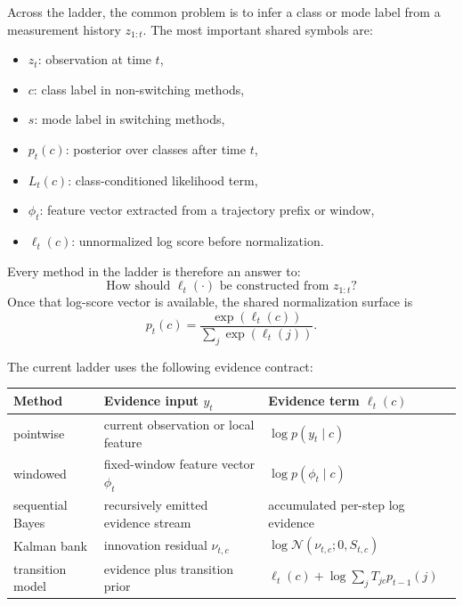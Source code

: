 \documentclass[11pt]{article}
\begin{document}
Across the ladder, the common problem is to infer a class or mode label from a
measurement history \(z_{1:t}\). The most important shared symbols are:
\begin{itemize}[leftmargin=1.5em]
    \item \(z_t\): observation at time \(t\),
    \item \(c\): class label in non-switching methods,
    \item \(s\): mode label in switching methods,
    \item \(p_t(c)\): posterior over classes after time \(t\),
    \item \(L_t(c)\): class-conditioned likelihood term,
    \item \(\phi_t\): feature vector extracted from a trajectory prefix or window,
    \item \(\ell_t(c)\): unnormalized log score before normalization.
\end{itemize}

Every method in the ladder is therefore an answer to:
\begin{equation}
    \text{How should } \ell_t(\cdot) \text{ be constructed from } z_{1:t}\text{?}
\end{equation}
Once that log-score vector is available, the shared normalization surface is
\begin{equation}
    p_t(c) = \frac{\exp(\ell_t(c))}{\sum_j \exp(\ell_t(j))}.
\end{equation}

The current ladder uses the following evidence contract:
\begin{center}
\small
\begin{tabular}{p{}p{}p{}}
\toprule
Method & Evidence input \(y_t\) & Evidence term \(\ell_t(c)\) \\
\midrule
pointwise & current observation or local feature & \(\log p(y_t \mid c)\) \\
windowed & fixed-window feature vector \(\phi_t\) & \(\log p(\phi_t \mid c)\) \\
sequential Bayes & recursively emitted evidence stream & accumulated per-step log evidence \\
Kalman bank & innovation residual \(\nu_{t,c}\) & \(\log \mathcal{N}(\nu_{t,c}; 0, S_{t,c})\) \\
transition model & evidence plus transition prior & \(\ell_t(c) + \log \sum_j T_{jc}p_{t-1}(j)\) \\
\bottomrule
\end{tabular}
\end{center}
\end{document}

